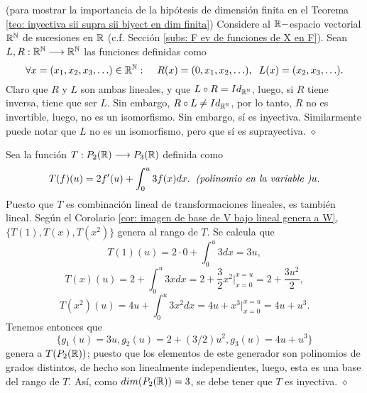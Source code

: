 \begin{ejem}
	(para mostrar la importancia de la hipótesis de dimensión finita
	en el Teorema \ref{teo: inyectiva sii supra sii biyect en dim finita})
	Considere al $\mathbb{R}-$espacio vectorial $\mathbb{R}^{\mathbb{N}}$ de sucesiones en $\mathbb{R}$
	(c.f. Sección \ref{subs: F ev de funciones de X en F}).
	Sean $L, R : \mathbb{R}^{\mathbb{N}} \longrightarrow \mathbb{R}^{\mathbb{N}}$ las funciones definidas como
	\begin{equation}
		\label{eq: funciones left y right shift}
		\forall x = (x_{1}, x_{2}, x_{3}, \ldots) \in \mathbb{R}^{\mathbb{N}}:
		\hspace{0.4cm}
		R(x) = (0, x_{1}, x_{2}, \ldots),
		\hspace{0.2cm}
		L(x) = (x_{2}, x_{3}, \ldots).
	\end{equation}
	Claro que $R$ y $L$ son ambas lineales, y que
	$L \circ R = Id_{\mathbb{R}^{\mathbb{N}}}$, luego, si $R$ tiene inversa,
	tiene que ser $L$. Sin embargo, 
	$R \circ L \neq Id_{\mathbb{R}^{\mathbb{N}}}$, por lo tanto, $R$ no es invertible,
	luego, no es un isomorfismo. Sin embargo, sí es inyectiva. Similarmente
	puede notar que $L$ no es un isomorfismo, pero que sí es
	suprayectiva. $\diamond$
\end{ejem}

\begin{ejem}	
Sea la función $T: P_{2}(\mathbb{R}) \longrightarrow P_{3}(\mathbb{R})$
definida como
\[
T(f)(u) = 2 f'(u) + \int_{0}^{u} 3f(x) dx.
\hspace{0.2cm} \textit{(polinomio en la variable )} u. 
\]
Puesto que $T$ es combinación lineal de transformaciones lineales,
es también lineal. Según el Corolario 
\ref{cor: imagen de base de V bajo lineal genera a W},
$\{ T(1), T(x), T(x^{2}) \}$ genera al rango de $T$. Se calcula que
\[
T(1)(u) = 2 \cdot 0 + \int_{0}^{u} 3 dx = 3u,
\]
\[
T(x)(u) = 2 + \int_{0}^{u} 3x dx = 2 + \frac{3}{2}x^{2} \Bigg|_{x=0}^{x=u}
= 2 + \frac{3u^{2}}{2},
\]
\[
T(x^{2})(u) = 4u + \int_{0}^{u} 3x^{2}dx = 
4u + x^{3} \Bigg|_{x=0}^{x=u} = 4u + u^{3}.
\]
Tenemos entonces que 
\[
\{ g_{1}(u) = 3u, g_{2}(u) = 2 + (3/2)u^{2}, g_{3}(u) = 4u + u^{3}  \}
\]
genera a $T(P_{2}(\mathbb{R}))$; puesto que los elementos de este generador
son polinomios de grados distintos, de hecho son linealmente independientes,
luego, esta es una base del rango de $T$. Así, como
$dim(P_{2}(\mathbb{R})) = 3$, se debe tener que $T$ es inyectiva.
$\diamond$
\end{ejem}

